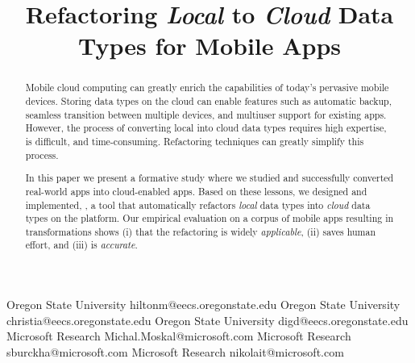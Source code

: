 \documentclass[preprint]{sigplanconf}
\begin{document}
\thispagestyle{empty}


\setlength{\pdfpageheight}{\paperheight}
\setlength{\pdfpagewidth}{\paperwidth}






\title{Refactoring \emph{Local} to \emph{Cloud} Data Types for Mobile Apps}

           {Oregon State University}
           {hiltonm@eecs.oregonstate.edu}
           {Oregon State University}
           {christia@eecs.oregonstate.edu}
           {Oregon State University}
           {digd@eecs.oregonstate.edu}
           {Microsoft Research}
           {Michal.Moskal@microsoft.com}
           {Microsoft Research}
           {sburckha@microsoft.com}
           {Microsoft Research}
           {nikolait@microsoft.com}
\maketitle


\begin{abstract}
Mobile cloud computing can greatly enrich the capabilities of today's pervasive mobile devices. 
Storing data types on the cloud can enable features such as automatic backup, seamless transition between multiple devices, 
and multiuser support for existing apps. 
However,  the process of converting local into cloud data types requires high expertise, is difficult, and time-consuming. 
Refactoring techniques can greatly simplify this process.
 
In this paper we present a formative study where we studied and successfully converted \numFormative real-world \TD apps into cloud-enabled apps. Based on these lessons, we designed and implemented, \tool, a tool that automatically refactors \emph{local} data types into \emph{cloud} data types on the \TD platform.
Our empirical evaluation on a corpus of \numScripts mobile apps resulting in \numTransformations transformations shows (i) that the refactoring is widely \emph{applicable}, (ii) \tool saves human effort, and (iii) \tool is \emph{accurate}. 

\end{abstract}
\end{document}
